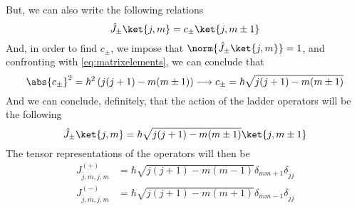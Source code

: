\documentclass[a4paper, 11pt]{book}
\newcommand{\1}{\opr{\mathds{1}}}
\newcommand{\opr}[1]{\hat{#1}}
\newcommand{\kd}[1]{\delta_{#1}}
\newcommand{\ladoprpm}[1]{\opr{#1}_{\pm}}
\theoremstyle{plain}
\begin{document}
	But, we can also write the following relations
	\begin{equation*}
		\ladoprpm{J}\ket{j,m}=c_{\pm}\ket{j,m\pm1}
	\end{equation*}
	And, in order to find $c_{\pm}$, we impose that $\norm{\ladoprpm{J}\ket{j,m}}=1$, and confronting with \eqref{eq:matrixelements}, we can conclude that
	\begin{equation}
		\abs{c_{\pm}}^2=\hbar^2\left( j(j+1)-m(m\pm1) \right)\longrightarrow c_{\pm}=\hbar\sqrt{j(j+1)-m(m\pm1)}
		\label{eq:cplusminus}
	\end{equation}
	And we can conclude, definitely, that the action of the ladder operators will be the following
	\begin{equation}
		\ladoprpm{J}\ket{j,m}=\hbar\sqrt{j(j+1)-m(m\pm1)}\ket{j,m\pm1}
		\label{eq:actionladopr}
	\end{equation}
	The tensor representations of the operators will then be
	\begin{equation}
		\begin{aligned}
			J_{\overline{j},\overline{m},j,m}^{(+)}&=\hbar\sqrt{j(j+1)-m(m-1)}\kd{\overline{m}m+1}\kd{\overline{j}j}\\
			J_{\overline{j},\overline{m},j,m}^{(-)}&=\hbar\sqrt{j(j+1)-m(m+1)}\kd{\overline{m}m-1}\kd{\overline{j}j}
		\end{aligned}
		\label{eq:tensorrepresentation}
	\end{equation}
\end{document}
